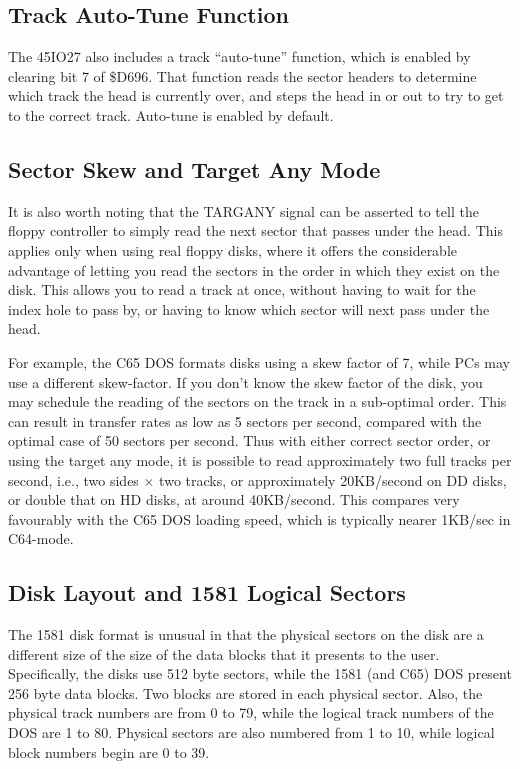 \subsection{Track Auto-Tune Function}

The 45IO27 also includes a track ``auto-tune'' function, which is enabled
by clearing bit 7 of \$D696.  That function reads the sector headers to
determine which track the head is currently over, and steps the head in or
out to try to get to the correct track. Auto-tune is enabled by default.

\subsection{Sector Skew and Target Any Mode}

It is also worth noting that the TARGANY signal can be asserted to
tell the floppy controller to simply read the next sector that passes
under the head.  This applies only when using real floppy disks, where
it offers the considerable advantage of letting you read the sectors
in the order in which they exist on the disk. This allows you to read
a track at once, without having to wait for the index hole to pass by,
or having to know which sector will next pass under the head.

For example,
the C65 DOS formats disks using a skew factor of 7, while PCs may use
a different skew-factor. If you don't know the skew factor of the disk,
you may schedule the reading of the sectors on the track in a sub-optimal
order. This can result in transfer rates as low as 5 sectors per second,
compared with the optimal case of 50 sectors per second.
Thus with either correct sector order, or using the target any mode,
it is possible to read approximately two full tracks per second,
i.e., two sides $\times$ two tracks, or approximately 20KB/second on
DD disks, or double that on HD disks, at around 40KB/second.  This
compares very favourably with the C65 DOS loading speed, which is
typically nearer 1KB/sec in C64-mode.

\subsection{Disk Layout and 1581 Logical Sectors}

The 1581 disk format is unusual in that the physical sectors on the
disk are a different size of the size of the data blocks that it
presents to the user.  Specifically, the disks use 512 byte sectors,
while the 1581 (and C65) DOS present 256 byte data blocks.
Two blocks are stored in each physical sector.  Also, the physical
track numbers are from 0 to 79, while the logical track numbers of the
DOS are 1 to 80.  Physical sectors are also numbered from 1 to 10,
while logical block numbers begin are 0 to 39.

